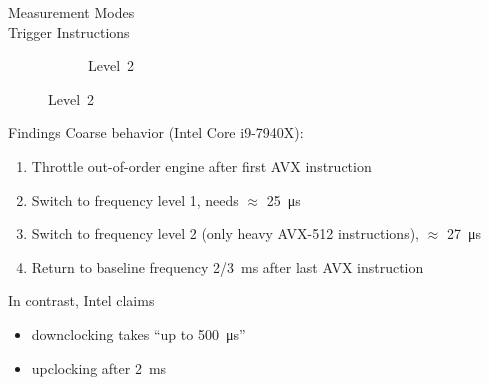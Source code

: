 \begin{frame}{Measurement Modes \\ \small Trigger Instructions}
\begin{figure}
\begin{subfigure}[b]{0.5\textwidth}
			\caption{Level~2}
		\end{subfigure}
	\end{figure}
\end{frame}

\begin{frame}[t]{Findings}
	Coarse behavior (Intel Core i9-7940X):
	\begin{enumerate}
		\item Throttle out-of-order engine after first AVX instruction
		\item Switch to frequency level 1, needs $\approx$ \SI{25}{\micro\second}
		\item Switch to frequency level 2 (only heavy AVX-512 instructions), $\approx$ \SI{27}{\micro\second}
		\item Return to baseline frequency \SI[quotient-mode=fraction]{2/3}{\milli\second} after last AVX instruction
	\end{enumerate}
	\pause
	In contrast, Intel claims
	\begin{itemize}
		\item downclocking takes \enquote{up to \SI{500}{\micro\second}}
		\item upclocking after \SI{2}{\milli\second}
	\end{itemize}
\end{frame}

